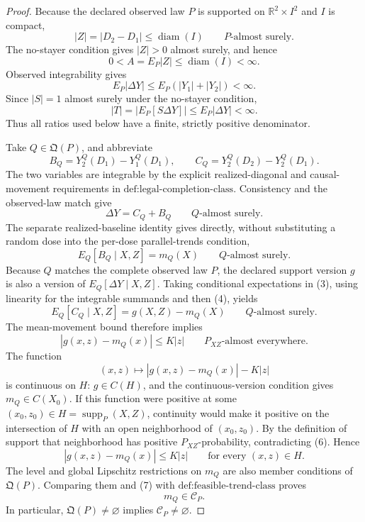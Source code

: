 \documentclass{article}
\begin{document}
\begin{proof}
Because the declared observed law \(P\) is supported on \(\mathbb R^2\times I^2\) and \(I\) is compact,
\[
|Z|=|D_2-D_1|\leq\operatorname{diam}(I)
\qquad P\text{-almost surely}.
\]
The no-stayer condition gives \(|Z|>0\) almost surely, and hence
\[
0<A=E_P|Z|\leq\operatorname{diam}(I)<\infty. \tag{1}
\]
Observed integrability gives
\[
E_P|\Delta Y|\leq E_P(|Y_1|+|Y_2|)<\infty.
\]
Since \(|S|=1\) almost surely under the no-stayer condition,
\[
|T|=|E_P[S\Delta Y]|\leq E_P|\Delta Y|<\infty. \tag{2}
\]
Thus all ratios used below have a finite, strictly positive denominator.

Take \(Q\in\mathfrak Q(P)\), and abbreviate
\[
B_Q=Y_2^Q(D_1)-Y_1^Q(D_1),
\qquad
C_Q=Y_2^Q(D_2)-Y_2^Q(D_1).
\]
The two variables are integrable by the explicit realized-diagonal and causal-movement requirements in \(\text{def:legal-completion-class}\). Consistency and the observed-law match give
\[
\Delta Y=C_Q+B_Q
\qquad Q\text{-almost surely}. \tag{3}
\]
The separate realized-baseline identity gives directly, without substituting a random dose into the per-dose parallel-trends condition,
\[
E_Q[B_Q\mid X,Z]=m_Q(X)
\qquad Q\text{-almost surely}. \tag{4}
\]
Because \(Q\) matches the complete observed law \(P\), the declared support version \(g\) is also a version of \(E_Q[\Delta Y\mid X,Z]\). Taking conditional expectations in (3), using linearity for the integrable summands and then (4), yields
\[
E_Q[C_Q\mid X,Z]=g(X,Z)-m_Q(X)
\qquad Q\text{-almost surely}. \tag{5}
\]
The mean-movement bound therefore implies
\[
|g(x,z)-m_Q(x)|\leq K|z|
\qquad P_{XZ}\text{-almost everywhere}. \tag{6}
\]
The function
\[
(x,z)\longmapsto |g(x,z)-m_Q(x)|-K|z|
\]
is continuous on \(H\): \(g\in C(H)\), and the continuous-version condition gives \(m_Q\in C(X_0)\). If this function were positive at some \((x_0,z_0)\in H=\operatorname{supp}_P(X,Z)\), continuity would make it positive on the intersection of \(H\) with an open neighborhood of \((x_0,z_0)\). By the definition of support that neighborhood has positive \(P_{XZ}\)-probability, contradicting (6). Hence
\[
|g(x,z)-m_Q(x)|\leq K|z|
\qquad\text{for every }(x,z)\in H. \tag{7}
\]
The level and global Lipschitz restrictions on \(m_Q\) are also member conditions of \(\mathfrak Q(P)\). Comparing them and (7) with \(\text{def:feasible-trend-class}\) proves
\[
m_Q\in\mathcal C_P. \tag{8}
\]
In particular, \(\mathfrak Q(P)\neq\varnothing\) implies \(\mathcal C_P\neq\varnothing\).


\end{proof}
\end{document}
